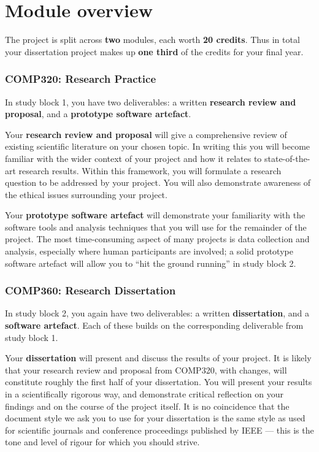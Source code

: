 \section*{Module overview}

The project is split across \textbf{two} modules, each worth \textbf{20 credits}.
Thus in total your dissertation project makes up \textbf{one third} of the credits for your final year.

\subsubsection*{COMP320: Research Practice}

In study block 1, you have two deliverables: a written \textbf{research review and proposal},
and a \textbf{prototype software artefact}.

Your \textbf{research review and proposal} will give a comprehensive review of existing scientific literature
on your chosen topic. In writing this you will become familiar with the wider context of your project
and how it relates to state-of-the-art research results.
Within this framework, you will formulate a research question to be addressed by your project.
You will also demonstrate awareness of the ethical issues surrounding your project.

Your \textbf{prototype software artefact} will demonstrate your familiarity with the software tools and analysis techniques
that you will use for the remainder of the project.
The most time-consuming aspect of many projects is data collection and analysis,
especially where human participants are involved;
a solid prototype software artefact will allow you to ``hit the ground running'' in study block 2.

\subsubsection*{COMP360: Research Dissertation}

In study block 2, you again have two deliverables: a written \textbf{dissertation},
and a \textbf{software artefact}. Each of these builds on the corresponding deliverable from study block 1.

Your \textbf{dissertation} will present and discuss the results of your project.
It is likely that your research review and proposal from COMP320, with changes, will constitute roughly the first half
of your dissertation.
You will present your results in a scientifically rigorous way, and demonstrate critical reflection
on your findings and on the course of the project itself.
It is no coincidence that the document style we ask you to use for your dissertation is the same style
as used for scientific journals and conference proceedings published by IEEE ---
this is the tone and level of rigour for which you should strive.

